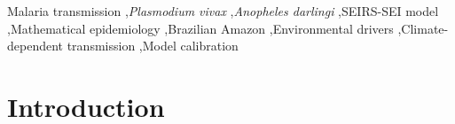 \documentclass[a4paper,fleqn]{cas-dc}
\begin{document}






\begin{keywords}
Malaria transmission \sep \textit{Plasmodium vivax} \sep \textit{Anopheles darlingi} \sep SEIRS-SEI model \sep Mathematical epidemiology \sep Brazilian Amazon \sep Environmental drivers \sep Climate-dependent transmission \sep Model calibration %

\end{keywords}


\maketitle

\section{Introduction}
\label{sec:intro}
\end{document}
